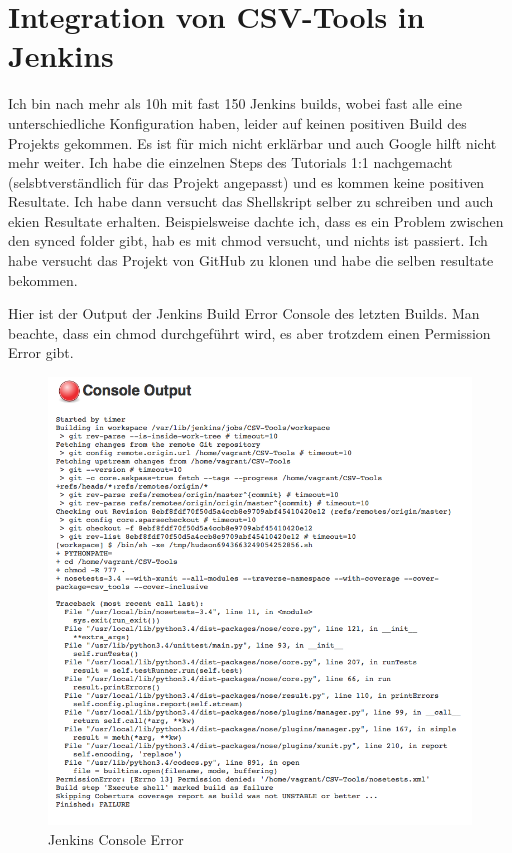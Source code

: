 \section{Integration von CSV-Tools in Jenkins}
\label{sec:Integration}

Ich bin nach mehr als 10h mit fast 150 Jenkins builds, wobei fast alle eine unterschiedliche Konfiguration haben, leider auf keinen positiven Build des Projekts gekommen. Es ist für mich nicht erklärbar und auch Google hilft nicht mehr weiter. Ich habe die einzelnen Steps des Tutorials 1:1 nachgemacht (selsbtverständlich für das Projekt angepasst) und es kommen keine positiven Resultate. Ich habe dann versucht das Shellskript selber zu schreiben und auch ekien Resultate erhalten. Beispielsweise dachte ich, dass es ein Problem zwischen den synced folder gibt, hab es mit chmod versucht, und nichts ist passiert. Ich habe versucht das Projekt von GitHub zu klonen und habe die selben resultate bekommen. 

Hier ist der Output der Jenkins Build Error Console des letzten Builds. Man beachte, dass ein chmod durchgeführt wird, es aber trotzdem einen Permission Error gibt.

\begin{figure}[h!]
	\caption{Jenkins Console Error}
	\centering
	\includegraphics[width=\textwidth]{images/jenkins_consoleError.png}
\end{figure}

